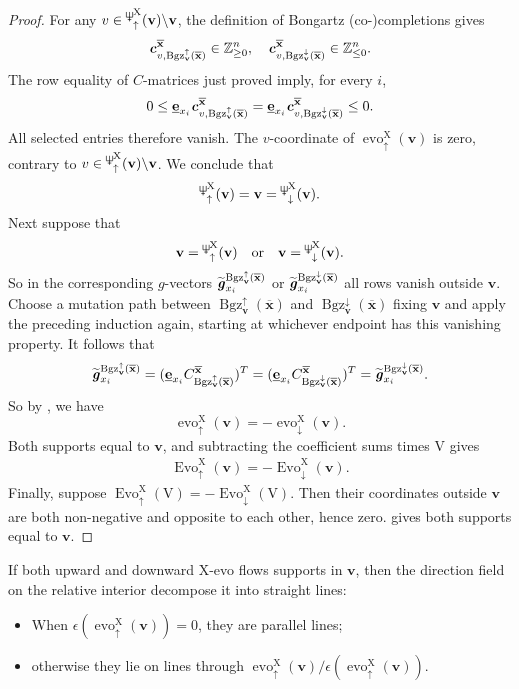 \documentclass[11pt,reqno]{amsart}
\newcommand{\Neptune}{\mathord{\text{\tikz[baseline=-.5ex,scale=.13]{\draw[line width=.45pt] (0,0)--(0,1.8) (-.6,1.8)--(-.6,.8)--(.6,.8)--(.6,1.8) (-.35,.35)--(.35,.35);}}}}
\theoremstyle{plain}
\theoremstyle{definition}
\numberwithin{equation}{section}
\newcommand\ZZ{\mathbb{Z}}
\newcommand\<{\langle}
\renewcommand\>{\rangle}
\newcommand{\on}[1]{\operatorname{#1}}
\def\vv{\mathbf{v}}
\def\sink{X}
\newcommand{\flowd}[1]{\on{evo}^{#1}_{\downarrow}}
\newcommand{\flowu}[1]{\on{evo}^{#1}_{\uparrow}}
\newcommand{\flowD}[1]{\on{Evo}_{\downarrow}^{#1}}
\newcommand{\flowU}[1]{\on{Evo}_{\uparrow}^{#1}}
\newcommand{\ccpt}[1]{\mathrm{#1}}%
\def\xevo{\ccpt{X}}%
\newcommand{\bfit}[1]{\textbf{\textit{#1}}}
\newcommand{\ubf}[1]{\underline{\mathbf{#1}}}
\def\xx{\mathbf{x}}%
\def\cvec{\bfit{c}}
\def\gvec{\bfit{g}}
\def\Cmat{{C}}
\newcommand{\Bgzp}[2]{\operatorname{Bgz}^{\uparrow}_{#2}(#1)}
\newcommand{\Bgzm}[2]{\operatorname{Bgz}^{\downarrow}_{#2}(#1)}
\newcommand{\suppd}[1]{\operatorname{\Neptune}_{\downarrow}^{#1}}
\newcommand{\suppu}[1]{\operatorname{\Neptune}_{\uparrow}^{#1}}
\newcommand{\ol}[1]{\overline{#1}}
\newcommand{\DT}[1]{#1^{\vee}}
\def\Xevo{\DT{\ccpt{X}}}
\def\csum{\epsilon}
\def\tgvec{\widetilde{\gvec}}
\begin{document}
\begin{proof}
For any $v\in\suppu{\xevo}(\vv)\backslash\vv$, the definition of Bongartz (co-)completions gives
\[
    \cvec^{\ol{\xx}}_{v,\Bgzp{\ol{\xx}}{\vv}}\in\ZZ^n_{\ge0},\quad
    \cvec^{\ol{\xx}}_{v,\Bgzm{\ol{\xx}}{\vv}}\in\ZZ^n_{\le0}.
\]
The row equality of $C$-matrices just proved imply, for every $i$,
\begin{gather}
    0\le \ubf{e}_{x_i}\cvec^{\ol{\xx}}_{v,\Bgzp{\ol{\xx}}{\vv}}
    =\ubf{e}_{x_i}\cvec^{\ol{\xx}}_{v,\Bgzm{\ol{\xx}}{\vv}}\le0.
\end{gather}
All selected entries therefore vanish.
The $v$-coordinate of $\flowu{\xevo}(\vv)$ is zero, contrary to $v\in\suppu{\xevo}(\vv)\backslash\vv$.
We conclude that
\begin{gather}
    \suppu{\xevo}(\vv)=\vv=\suppd{\xevo}(\vv).
\end{gather}
Next suppose that
\begin{gather}
    \vv=\suppu{\xevo}(\vv)
    \quad\text{or}\quad
    \vv=\suppd{\xevo}(\vv).
\end{gather}
So in the corresponding $g$-vectors $\tgvec^{\Bgzp{\ol\xx}{\vv}}_{x_i}$ or $\tgvec^{\Bgzm{\ol\xx}{\vv}}_{x_i}$ all rows vanish outside $\vv$.
Choose a mutation path between $\Bgzp{\ol{\xx}}{\vv}$ and $\Bgzm{\ol{\xx}}{\vv}$ fixing $\vv$ and apply the preceding induction again, 
starting at whichever endpoint has this vanishing property.
It follows that
\begin{gather}
    \tgvec^{\Bgzp{\ol{\xx}}{\vv}}_{x_i}
    =(\ubf{e}_{x_i}\Cmat^{\ol{\xx}}_{\Bgzp{\ol{\xx}}{\vv}})^T
    =(\ubf{e}_{x_i}\Cmat^{\ol{\xx}}_{\Bgzm{\ol{\xx}}{\vv}})^T
    =\tgvec^{\Bgzm{\ol{\xx}}{\vv}}_{x_i}.
\end{gather}
So by , we have
\[
    \flowu{\xevo}(\vv)=-\flowd{\xevo}(\vv).
\]
Both supports equal to $\vv$, and subtracting the coefficient sums times $\ccpt{V}$ gives
\begin{gather}
    \flowU{\xevo}(\vv)=-\flowD{\xevo}(\vv).
\end{gather}
Finally, suppose $\flowU{\xevo}(\ccpt{V})=-\flowD{\xevo}(\ccpt{V})$. 
Then their coordinates outside $\vv$ are both non-negative and opposite to each other, hence zero.
 gives both supports equal to $\vv$. 
\end{proof}

If both upward and downward $\xevo$-evo flows supports in $\vv$, then the direction field on the relative interior
decompose it into straight lines:
\begin{itemize}
    \item When $\csum(\flowu{\xevo}(\vv))=0$, they are parallel lines;
    \item otherwise they lie on lines through $\flowu{\xevo}(\vv)/\csum(\flowu{\xevo}(\vv))$.
\end{itemize}
\end{document}
